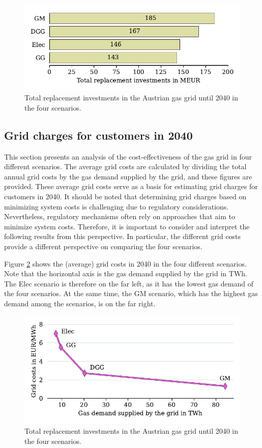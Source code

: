 \begin{figure}[h]
	\centering
	\includegraphics[width=0.8\linewidth]{figures/results/total_replacement_inv/replace_inv_2040.pdf}
	\caption{Total replacement investments in the Austrian gas grid until 2040 in the four scenarios.}
	\label{fig_grid_repl_inv}
\end{figure}

\subsection{Grid charges for customers in 2040}\label{res_grid_charges}
This section presents an analysis of the cost-effectiveness of the gas grid in four different scenarios. The average grid costs are calculated by dividing the total annual grid costs by the gas demand supplied by the grid, and these figures are provided. These average grid costs serve as a basis for estimating grid charges for customers in 2040. It should be noted that determining grid charges based on minimizing system costs is challenging due to regulatory considerations. Nevertheless, regulatory mechanisms often rely on approaches that aim to minimize system costs. Therefore, it is important to consider and interpret the following results from this perspective. In particular, the different grid costs provide a different perspective on comparing the four scenarios.\vspace{0.3cm}

Figure \ref{fig_grid_charges} shows the (average) grid costs in 2040 in the four different scenarios. Note that the horizontal axis is the gas demand supplied by the grid in TWh. The Elec scenario is therefore on the far left, as it has the lowest gas demand of the four scenarios. At the same time, the GM scenario, which has the highest gas demand among the scenarios, is on the far right. 

\begin{figure}[h]
	\centering
	\includegraphics[width=1\linewidth]{figures/results/grid_charges/grid_charges.pdf}
	\caption{Total replacement investments in the Austrian gas grid until 2040 in the four scenarios.}
	\label{fig_grid_charges}
\end{figure}


